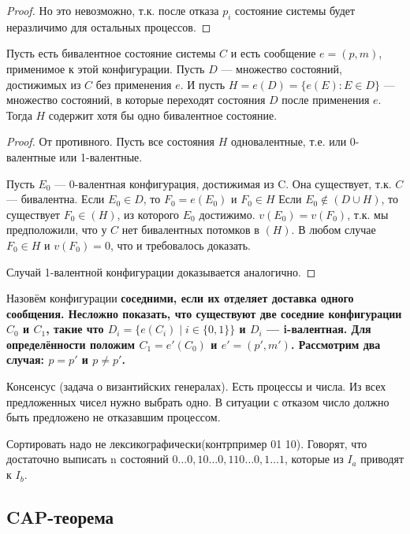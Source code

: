 \begin{flpproof}
\begin{proof}
Но это невозможно, т.к. после отказа $p_i$ состояние системы будет
неразличимо для остальных процессов.
\end{proof}

\begin{thm}
Пусть есть бивалентное состояние системы $C$ и есть сообщение $e = (p, m)$, применимое к этой конфигурации. Пусть $D$ --- множество состояний, достижимых из $C$ без применения $e$. И пусть $H = e(D) = \{e(E) : E \in D\}$ --- множество состояний, в которые переходят состояния $D$ после применения $e$. Тогда $H$ содержит хотя бы одно бивалентное состояние.
\end{thm}
\begin{proof}
От противного. Пусть все состояния $H$ одновалентные, т.е. или 0-валентные или 1-валентные.

Пусть $E_0$ --- 0-валентная конфигурация, достижимая из C. Она существует, т.к. $C$ --- бивалентна.
Если $E_0 \in D$, то $F_0 = e(E_0)$ и $F_0 \in H$
Если $E_0 \not\in (D \cup H)$, то существует $F_0 \in (H)$, из которого $E_0$ достижимо.
$v(E_0) = v(F_0)$, т.к. мы предположили, что у $C$ нет бивалентных потомков в $(H)$.
В любом случае $F_0 \in H$ и $v(F_0) = 0$, что и требовалось доказать.

Случай 1-валентной конфигурации доказывается аналогично.
\end{proof}

Назовём конфигурации \bf{соседними}, если их отделяет доставка одного сообщения.
Несложно показать, что существуют две соседние конфигурации $C_0$ и $C_1$, такие что $D_i = \{e(C_i) \mid i \in \{0, 1\}\}$ и $D_i$ --- i-валентная.
Для определённости положим $C_1 = e'(C_0)$ и $e' = (p', m')$.
Рассмотрим два случая: $p = p'$ и $p \ne p'$.

Консенсус (задача о византийских генералах). Есть процессы и числа. Из всех предложенных чисел нужно выбрать одно. В ситуации с отказом число должно быть предложено не отказавшим процессом. 

Сортировать надо не лексикографически(контрпример 01 10). Говорят, что достаточно выписать n состояний $0\dots0, 10\dots0, 110\dots0, 1\dots1$, которые из $I_a$  приводят к $I_b$. 
\end{flpproof}

\subsection{CAP-теорема}
